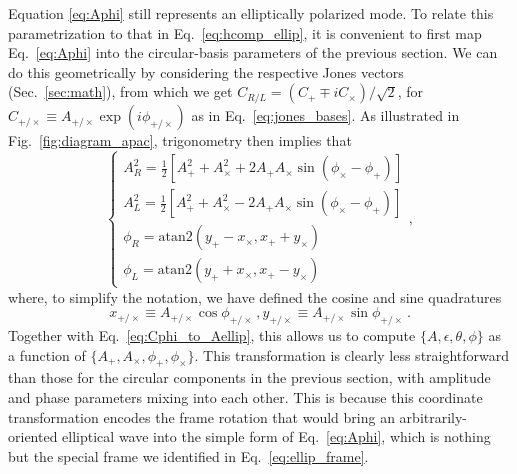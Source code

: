 \documentclass[aps,prd,twocolumn,superscriptaddress,preprintnumbers,floatfix,nofootinbib]{revtex4-2}
\newcommand*{\eq}[1]{Eq.~\eqref{eq:#1}}
\begin{document}
\newcommand{\xp}{x_{+}}
\newcommand{\xc}{x_{\times}}
\newcommand{\xpc}{x_{+/\times}}
\newcommand{\yp}{y_{+}}
\newcommand{\yc}{y_{\times}}
\newcommand{\ypc}{y_{+/\times}}

\newcommand{\xr}{x_{R}}
\newcommand{\xl}{x_{L}}
\newcommand{\xrl}{x_{R/L}}
\newcommand{\yr}{y_{R}}
\newcommand{\yl}{y_{L}}
\newcommand{\yrl}{y_{R/L}}


Equation \eqref{eq:Aphi} still represents an elliptically polarized mode.
To relate this parametrization to that in Eq.~\eqref{eq:hcomp_ellip}, it is convenient to first map Eq.~\eqref{eq:Aphi} into the circular-basis parameters of the previous section.
We can do this geometrically by considering the respective Jones vectors (Sec.~\ref{sec:math}), from which we get $C_{R/L} = (C_+ \mp i C_\times)/\sqrt{2}$, for $C_{+/\times} \equiv A_{+/\times} \exp(i\phi_{+/\times})$ as in \eq{jones_bases}.
As illustrated in Fig.~\ref{fig:diagram_apac}, trigonometry then implies that
\begin{equation} \label{eq:Aphi_to_Cphi}
\begin{cases}
A_R^2 = \frac{1}{2}\left[A_+^2 + A_\times^2 + 2 A_+ A_\times \sin(\phi_\times - \phi_+)\right] \\
A_L^2 = \frac{1}{2}\left[A_+^2 + A_\times^2 - 2 A_+ A_\times \sin(\phi_\times - \phi_+)\right] \\
\phi_R = \mathrm{atan2}\left(\yp -\xc, \xp + \yc \right)\\
\phi_L = \mathrm{atan2}\left(\yp + \xc, \xp - \yc \right) 
\end{cases} ,
\end{equation}
where, to simplify the notation, we have defined the cosine and sine quadratures
\begin{subequations} \label{eq:xy}
\begin{equation}
\xpc \equiv A_{+/\times} \cos \phi_{+/\times} \, ,
\end{equation}
\begin{equation}
\ypc \equiv A_{+/\times} \sin \phi_{+/\times} \, .
\end{equation}
\end{subequations}
Together with Eq.~\eqref{eq:Cphi_to_Aellip}, this allows us to compute $\{A, \epsilon, \theta, \phi\}$ as a function of $\{A_+, A_\times, \phi_+, \phi_\times\}$.
This transformation is clearly less straightforward than those for the circular components in the previous section, with amplitude and phase parameters mixing into each other.
This is because this coordinate transformation encodes the frame rotation that would bring an arbitrarily-oriented elliptical wave into the simple form of Eq.~\eqref{eq:Aphi}, which is nothing but the special frame we identified in Eq.~\eqref{eq:ellip_frame}.
\end{document}
